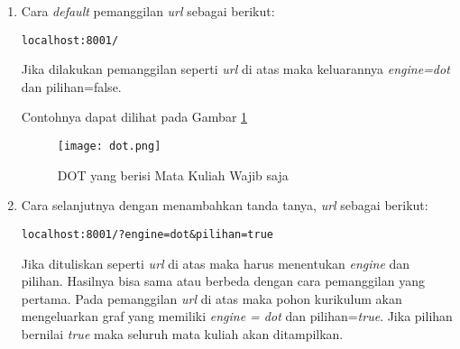 \begin{enumerate}
\item Cara \textit{default} pemanggilan \textit{url} sebagai berikut:
\begin{lstlisting}
localhost:8001/ 
\end{lstlisting}
Jika dilakukan pemanggilan seperti \textit{url} di atas maka keluarannya \textit{engine=dot} dan pilihan=false.

Contohnya dapat dilihat pada Gambar \ref{fig: wajib}
\begin{figure}[H]
		\centering
		\texttt{[image: dot.png]}
		\caption{DOT yang berisi Mata Kuliah Wajib saja}
		\label{fig: wajib}
\end{figure}	

\item Cara selanjutnya dengan menambahkan tanda tanya, \textit{url} sebagai berikut:
\begin{lstlisting}
localhost:8001/?engine=dot&pilihan=true
\end{lstlisting}

Jika dituliskan seperti \textit{url} di atas maka harus menentukan \textit{engine} dan pilihan. Hasilnya bisa sama atau berbeda dengan cara pemanggilan yang pertama. Pada pemanggilan \textit{url} di atas maka pohon kurikulum akan mengeluarkan graf yang memiliki \textit{engine = dot} dan pilihan=\textit{true}. Jika pilihan bernilai \textit{true} maka seluruh mata kuliah akan ditampilkan.

\end{enumerate}